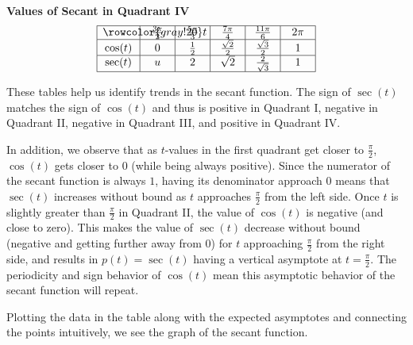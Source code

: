 \documentclass[nooutcomes, noauthor]{ximera}
\begin{document}
\begin{center}
\textbf{Values of Secant in Quadrant IV}
\renewcommand*{\arraystretch}{2.5}
\setlength{\arrayrulewidth}{0.5mm}
\setlength{\tabcolsep}{18pt}
\[
\begin{array}{|>{\centering\arraybackslash$} p{1cm} <{$} | >{\centering\arraybackslash$} p{.75cm} <{$} |  >{\centering\arraybackslash$} p{.75cm} <{$} |  >{\centering\arraybackslash$} p{.75cm} <{$} |  >{\centering\arraybackslash$} p{.75cm} <{$} |  >{\centering\arraybackslash$} p{.75cm} <{$} |}
\hline 
\rowcolor{gray!20}
t & \frac{3\pi}{2} & \frac{5\pi}{3} & \frac{7\pi}{4} & \frac{11\pi}{6} & 2\pi\\
\hline
\cos(t) & 0 & \frac{1}{2} &\frac{\sqrt{2}}{2} & \frac{\sqrt{3}}{2} & 1\\
\hline
\sec(t) & u & 2& \sqrt{2} & \frac{2}{\sqrt{3}}& 1\\
\hline 
\end{array}
\]
\end{center}

These tables help us identify trends in the secant function.  The sign of \(\sec(t)\) matches the sign of \(\cos(t)\) and thus is positive in Quadrant I, negative in Quadrant II, negative in Quadrant III, and positive in Quadrant IV.

In addition, we observe that as \(t\)-values in the first quadrant get closer to \(\frac{\pi}{2}\), \(\cos(t)\) gets closer to \(0\) (while being always positive).  Since the numerator of the secant function is always \(1\), having its denominator approach \(0\) means that \(\sec(t)\) increases without bound as \(t\) approaches \(\frac{\pi}{2}\) from the left side.  Once \(t\) is slightly greater than \(\frac{\pi}{2}\) in Quadrant II, the value of \(\cos(t)\) is negative (and close to zero).  This makes the value of \(\sec(t)\) decrease without bound (negative and getting further away from \(0\)) for \(t\) approaching \(\frac{\pi}{2}\) from the right side, and results in \(p(t) = \sec(t)\) having a vertical asymptote at \(t = \frac{\pi}{2}\).  The periodicity and sign behavior of \(\cos(t)\) mean this asymptotic behavior of the secant function will repeat.

Plotting the data in the table along with the expected asymptotes and connecting the points intuitively, we see the graph of the secant function.
\end{document}
